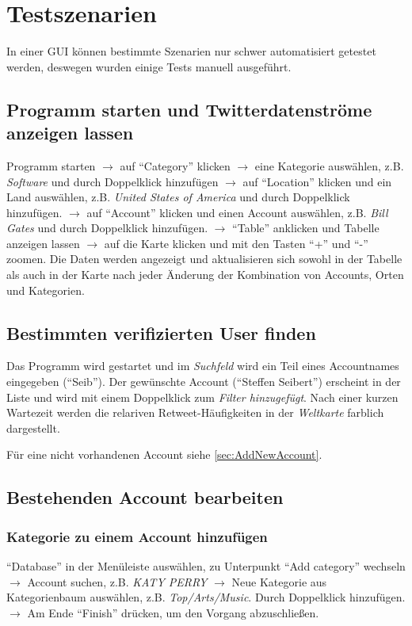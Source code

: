 \section{Testszenarien}

In einer GUI können bestimmte Szenarien nur schwer automatisiert getestet werden, deswegen wurden einige Tests manuell ausgeführt.

\subsection{Programm starten und Twitterdatenströme anzeigen lassen}
Programm starten $\to$ auf "`Category"' klicken $\to$ eine Kategorie auswählen, z.B. \textit{Software} und durch Doppelklick hinzufügen $\to$ auf "`Location"' klicken und ein Land auswählen, z.B. \textit{United States of America} und durch Doppelklick hinzufügen. $\to$ auf "`Account"' klicken und einen Account auswählen, z.B. \textit{Bill Gates} und durch Doppelklick hinzufügen. $\to$ "`Table"' anklicken und Tabelle anzeigen lassen $\to$ auf die Karte klicken und mit den Tasten "`+"' und "`-"' zoomen.
Die Daten werden angezeigt und aktualisieren sich sowohl in der Tabelle als auch in der Karte nach jeder Änderung der Kombination von Accounts, Orten und Kategorien.
\subsection{Bestimmten verifizierten User finden}
Das Programm wird gestartet und im \textit{Suchfeld} wird ein Teil eines Accountnames eingegeben ("`Seib"'). Der gewünschte Account ("`Steffen Seibert"') erscheint in der Liste und wird mit einem Doppelklick zum \textit{Filter hinzugefügt}. Nach einer kurzen Wartezeit werden die relariven Retweet-Häufigkeiten in der \textit{Weltkarte} farblich dargestellt.

Für eine nicht vorhandenen Account siehe \cref{sec:AddNewAccount}.
\subsection{Bestehenden Account bearbeiten}
\subsubsection{Kategorie zu einem Account hinzufügen}
"`Database"' in der Menüleiste auswählen, zu Unterpunkt "`Add category"' wechseln $\to$ Account suchen, z.B. \textit{KATY PERRY} $\to$ Neue Kategorie aus Kategorienbaum auswählen, z.B. \textit{Top/Arts/Music}. Durch Doppelklick hinzufügen. $\to$ Am Ende "`Finish"' drücken, um den Vorgang abzuschließen.
